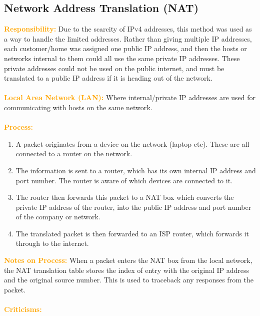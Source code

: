 \documentclass[a4paper,10pt]{article}
\begin{document}
\subsection{Network Address Translation (NAT)}
\textcolor{Orange}{\textbf{Responsibility:}} Due to the scarcity of IPv4 addresses, this method was used as a way to handle the limited addresses. Rather than giving multiple IP addresses, each customer/home was assigned one public IP address, and then the hosts or networks internal to them could all use the same private IP addresses. These private addresses could not be used on the public internet, and must be translated to a public IP address if it is heading out of the network. \\\\
\textcolor{Orange}{\textbf{Local Area Network (LAN):}} Where internal/private IP addresses are used for communicating with hosts on the same network. \\\\
\textcolor{Orange}{\textbf{Process:}} 
\begin{enumerate}
	\item A packet originates from a device on the network (laptop etc). These are all connected to a router on the network. 
	\item The information is sent to a router, which has its own internal IP address and port number. The router is aware of which devices are connected to it. 
	\item The router then forwards this packet to a NAT box which converts the private IP address of the router, into the public IP address and port number of the company or network. 
	\item The translated packet is then forwarded to an ISP router, which forwards it through to the internet. 
\end{enumerate}
\textcolor{Orange}{\textbf{Notes on Process:}} When a packet enters the NAT box from the local network, the NAT translation table stores the index of entry with the original IP address and the original source number. This is used to traceback any responses from the packet. \\\\
\textcolor{Orange}{\textbf{Criticisms:}} 
\end{document}
